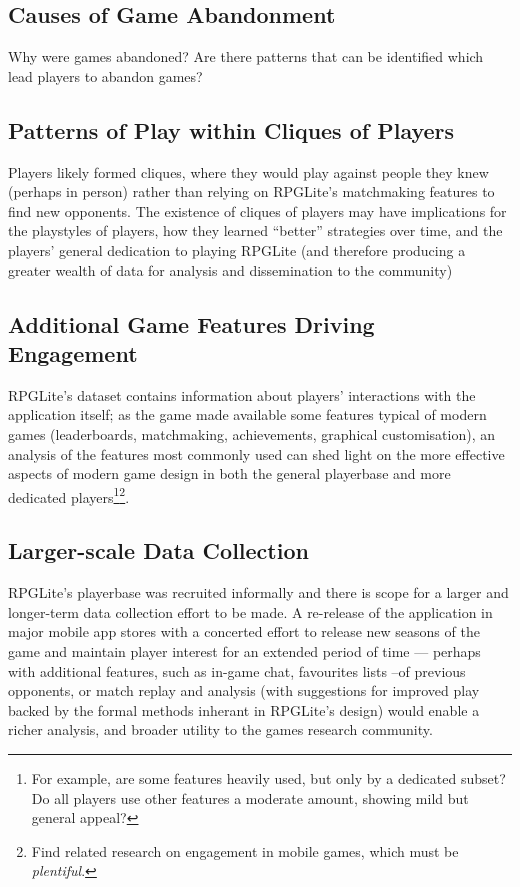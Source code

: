 \subsection{Causes of Game Abandonment}
Why were games abandoned? Are there patterns that can be identified which lead
players to abandon games?
    
\subsection{Patterns of Play within Cliques of Players}
Players likely formed cliques, where they would play against people they knew
(perhaps in person) rather than relying on RPGLite's matchmaking features to
find new opponents. The existence of cliques of players may have implications
for the playstyles of players, how they learned ``better'' strategies over time,
and the players' general dedication to playing RPGLite (and therefore producing
a greater wealth of data for analysis and dissemination to the community)
    
\subsection{Additional Game Features Driving Engagement}
RPGLite's dataset contains information about players' interactions with the
application itself; as the game made available some features typical of modern
games (leaderboards, matchmaking, achievements, graphical customisation), an
analysis of the features most commonly used can shed light on the more effective
aspects of modern game design in both the general playerbase and more dedicated
players\footnote{For example, are some features heavily used, but only by a
dedicated subset? Do all players use other features a moderate amount, showing
mild but general appeal?}\footnote{Find related research on engagement in mobile
games, which must be \emph{plentiful}.}.
    

\subsection{Larger-scale Data Collection}
RPGLite's playerbase was recruited informally and there is scope for a larger
and longer-term data collection effort to be made. A re-release of the
application in major mobile app stores with a concerted effort to release new
seasons of the game and maintain player interest for an extended period of time
--- perhaps with additional features, such as in-game chat, favourites lists
--of previous opponents, or match replay and analysis (with suggestions for
improved play backed by the formal methods inherant in RPGLite's design) would
enable a richer analysis, and broader utility to the games research community.

